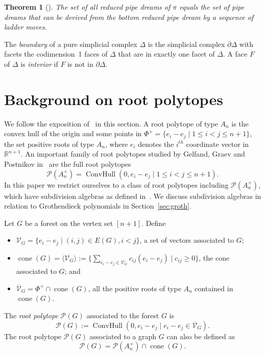 \documentclass[10pt]{amsart}
\newtheorem{theo}{Theorem}[section]
\theoremstyle{definition}
\numberwithin{equation}{section}
\DeclareMathOperator{\cone}{cone}
\DeclareMathOperator{\ConvHull}{ConvHull}
\newcommand*\+{\smash{\lower2pt\hbox{\rlap{\vrule height14pt}}\raise2pt\hbox{\rlap{\hskip-3pt \vrule height.4pt depth0pt width14.7pt}}}}
\begin{document}
\begin{theo}[\cite{rc}]\label{thm:ladder}
The set of all reduced pipe dreams of $\pi$ equals the set of pipe dreams that can be derived from the bottom reduced pipe dream by a sequence of ladder moves.
\end{theo}

The \emph{boundary} of a pure simplicial complex $\Delta$ is the simplicial complex $\partial\Delta$ with facets the codimension~1 faces of $\Delta$ that are in exactly one facet of $\Delta$. A face $F$ of $\Delta$ is \emph{interior} if $F$ is not in $\partial\Delta$.

\section{Background on root polytopes}\label{sec:root}

We follow the exposition of~\cite[Section~4]{groth} in this section. A root polytope of type $A_{n}$ is the convex hull of the origin and some points in $\Phi^+=\{e_i-e_j \mid1\leq i<j\leq n+1\}$, the set positive roots of type $A_n$, where $e_i$ denotes the $i^{th}$ coordinate vector in $\mathbb{R}^{n+1}$. An important family of root polytopes studied by Gelfand, Graev and Postnikov in~\cite{roothistory} are the full root polytopes
\[
\mathcal{P}(A_{n}^+)=\ConvHull(0, e_i-e_j \mid 1\leq i<j\leq n+1).
\]
In this paper we restrict ourselves to a class of root polytopes including $\mathcal{P}(A_{n}^+)$, which have subdivision algebras as defined in~\cite{root1}. We discuss subdivision algebras in relation to Grothendieck polynomials in Section~\ref{sec:groth}.

\goodbreak
Let $G$ be a forest on the vertex set $[n+1]$. Define
\begin{itemize}
\item $\mathcal{V}_G=\{e_i-e_j \mid (i, j) \in E(G), i<j\}$, a set of vectors associated to $G$;
\item $\cone(G)=\langle \mathcal{V}_G \rangle:=\{\sum_{ e_i-e_j \in \mathcal{V}_G}c_{ij} (e_i-e_j) \mid c_{ij}\geq0\}$, the cone associated to $G$; and
\item $\overline{\mathcal{V}}_G=\Phi^+ \cap \cone(G)$, all the positive roots of type $A_n$ contained in $\cone(G)$.
\end{itemize}

The \emph{root polytope} $\mathcal{P}(G)$ associated to the forest $G$ is
\begin{equation}\label{eq11}
\mathcal{P}(G):=\ConvHull(0, e_i-e_j \mid e_i-e_j \in \overline{\mathcal{V}}_G).
\end{equation}
The root polytope $\mathcal{P}(G)$ associated to a graph $G$ can also be defined as 
\begin{equation}\label{eq21}
\mathcal{P}(G)=\mathcal{P}(A_n^+) \cap \cone(G).
\end{equation}
\end{document}
